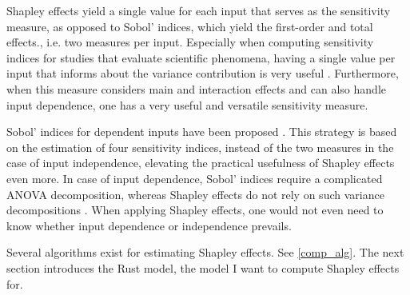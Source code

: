 Shapley effects yield a single value for each input that serves as the sensitivity measure, as opposed to Sobol' indices, which yield the first-order and total effects., i.e. two measures per input. Especially when computing sensitivity indices for studies that evaluate scientific phenomena, having a single value per input that informs about the variance contribution is very useful \citep{SNS16}. Furthermore, when this measure considers main and interaction effects and can also handle input dependence, one has a very useful and versatile sensitivity measure.

Sobol' indices for dependent inputs have been proposed \citep{MTA15}. This strategy is based on the estimation of four sensitivity indices, instead of the two measures in the case of input independence, elevating the practical usefulness of Shapley effects even more. In case of input dependence, Sobol' indices require a complicated ANOVA decomposition, whereas Shapley effects do not rely on such variance decompositions \citep{IP19}. When applying Shapley effects, one would not even need to know whether input dependence or independence prevails.

Several algorithms exist for estimating Shapley effects. See \cref{comp_alg}. The next section introduces the Rust model, the model I want to compute Shapley effects for.
